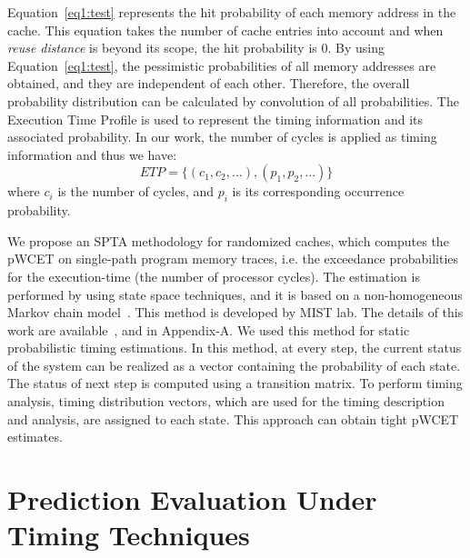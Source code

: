 
Equation~\ref{eq1:test} represents the hit probability of each memory address in
the cache. This equation takes the number of cache entries into account and when
\textit{reuse distance} is beyond its scope, the hit probability is 0. By using
Equation~\ref{eq1:test}, the pessimistic probabilities of all memory addresses are
obtained, and they are independent of each other. Therefore, the overall
probability distribution can be calculated by convolution of all probabilities. The Execution Time Profile is used to represent the timing information and its
associated probability. In our work, the number of cycles is applied as
timing information and thus we have:
\[
ETP = \{(c_1, c_2, ...), (p_1, p_2, ...)\} 
\]
where $c_i$ is the number of cycles, and $p_i$ is its corresponding occurrence
probability.



We propose an SPTA methodology for randomized caches, which computes the pWCET on single-path program memory traces, i.e. the exceedance probabilities for the execution-time (the number of processor cycles). The estimation is performed by using state space techniques, and it is based on a non-homogeneous Markov chain model~\cite{serfozo:markov}. This method is developed by MIST lab. The details of this work are available~\cite{spta:chao}, and in Appendix-A. We used this method for static probabilistic timing estimations. In this method, at every step, the current status of the system can be realized as
a vector containing the probability of each state. The status of
next step is computed using a transition matrix. To perform
timing analysis, timing distribution vectors, which are used
for the timing description and analysis, are assigned to each
state. This approach can obtain tight pWCET estimates. 






\section{Prediction Evaluation Under Timing Techniques}

